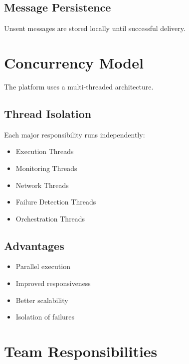 \documentclass[12pt,a4paper]{article}
\begin{document}
\subsection{Message Persistence}

Unsent messages are stored locally until successful delivery.

\section{Concurrency Model}

The platform uses a multi-threaded architecture.

\subsection{Thread Isolation}

Each major responsibility runs independently:

\begin{itemize}
    \item Execution Threads
    \item Monitoring Threads
    \item Network Threads
    \item Failure Detection Threads
    \item Orchestration Threads
\end{itemize}

\subsection{Advantages}

\begin{itemize}
    \item Parallel execution
    \item Improved responsiveness
    \item Better scalability
    \item Isolation of failures
\end{itemize}

\newpage

\section{Team Responsibilities}
\end{document}
